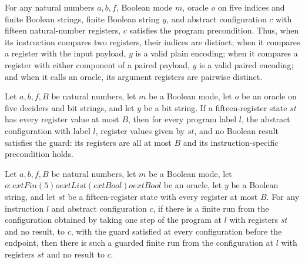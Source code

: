 \begin{lemma}
\label{Complexity.PathHard.preS_A}
\leanok
{}
For any natural numbers $a,b,f$, Boolean mode $m$, oracle $o$ on five indices and finite
Boolean strings, finite Boolean string $y$, and abstract configuration $c$ with fifteen
natural-number registers, $c$ satisfies the program precondition. Thus, when its
instruction compares two registers, their indices are distinct; when it compares a
register with the input payload, $y$ is a valid plain encoding; when it compares a
register with either component of a paired payload, $y$ is a valid paired encoding; and
when it calls an oracle, its argument registers are pairwise distinct.
\end{lemma}

\begin{lemma}
\label{Complexity.PathHard.gb_of}
\leanok
{}
Let $a,b,f,B$ be natural numbers, let $m$ be a Boolean mode, let $o$ be an oracle on
five deciders and bit strings, and let $y$ be a bit string. If a fifteen-register state
$st$ has every register value at most $B$, then for every program label $l$, the
abstract configuration with label $l$, register values given by $st$, and no Boolean
result satisfies the guard: its registers are all at most $B$ and its
instruction-specific precondition holds.
\end{lemma}

\begin{lemma}
\label{Complexity.PathHard.step_of}
\leanok
{}
Let $a,b,f,B$ be natural numbers, let $m$ be a Boolean mode, let
$o:	ext{Fin}(5)	o	ext{List}(	ext{Bool})	o	ext{Bool}$ be an oracle, let $y$ be a Boolean
string, and let $st$ be a fifteen-register state with every register at most $B$. For
any instruction $l$ and abstract configuration $c$, if there is a finite run from the
configuration obtained by taking one step of the program at $l$ with registers $st$ and
no result, to $c$, with the guard satisfied at every configuration before the endpoint,
then there is such a guarded finite run from the configuration at $l$ with registers
$st$ and no result to $c$.
\end{lemma}

